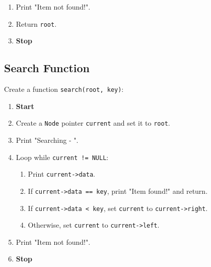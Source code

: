 {\begin{enumerate}[label=\arabic*:,left=0pt]
\begin{enumerate}[label=3.\arabic*:, start=1]
\begin{enumerate}[label=3.2.\arabic*:, start=1]
\begin{enumerate}[label=3.2.2.\arabic*:, start=1]
                            \item Free \texttt{current}.
                          \end{enumerate}
                    \item Print "Item deleted successfully!".
                    \item Return \texttt{root}.
                  \end{enumerate}
            \item If \texttt{current->data < key}, set \texttt{current} to \texttt{current->right}.
            \item Otherwise, set \texttt{current} to \texttt{current->left}.
          \end{enumerate}
    \item Print "Item not found!".
    \item Return \texttt{root}.
    \item \textbf{Stop}
  \end{enumerate}

  \subsection{Search Function}
  Create a function \texttt{search(root, key)}:
  \begin{enumerate}[label=\arabic*:,left=0pt]
    \item \textbf{Start}
    \item Create a \texttt{Node} pointer \texttt{current} and set it to \texttt{root}.
    \item Print "Searching - ".
    \item Loop while \texttt{current != NULL}:
          \begin{enumerate}[label=1.\arabic*:, start=1]
            \item Print \texttt{current->data}.
            \item If \texttt{current->data == key}, print "Item found!" and return.
            \item If \texttt{current->data < key}, set \texttt{current} to \texttt{current->right}.
            \item Otherwise, set \texttt{current} to \texttt{current->left}.
          \end{enumerate}
    \item Print "Item not found!".
    \item \textbf{Stop}
  \end{enumerate}

}
